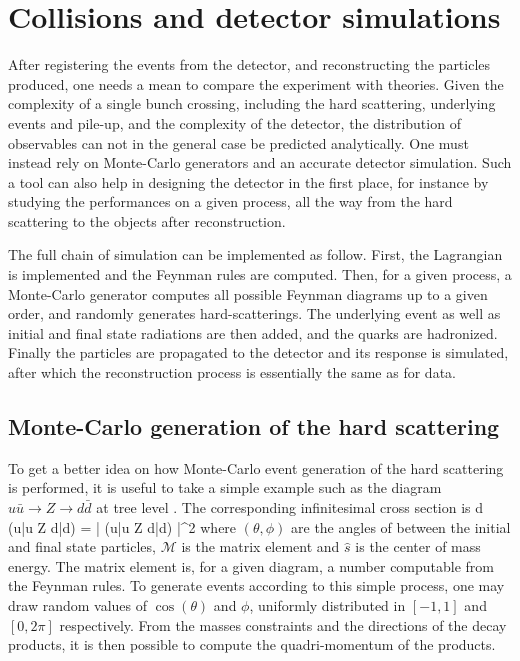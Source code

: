     \section{Collisions and detector simulations \label{sec:simu}}

    After registering the events from the detector, and reconstructing the particles
    produced, one needs a mean to compare the experiment with theories. Given
    the complexity of a single bunch crossing, including the hard scattering,
    underlying events and pile-up, and the complexity of the detector, the distribution
    of observables can not in the general case be predicted analytically. One must
    instead rely on Monte-Carlo generators and an accurate detector simulation.
    Such a tool can also help in designing the detector in the first place, for
    instance by studying the performances on a given process, all the way
    from the hard scattering to the objects after reconstruction.

    The full chain of simulation can be implemented as follow. First, the Lagrangian
    is implemented and the Feynman rules are computed. Then, for a given process, a
    Monte-Carlo generator computes all possible Feynman diagrams up to a given order, and
    randomly generates hard-scatterings. The underlying event as well as initial and final
    state radiations are then added, and the quarks are hadronized. Finally the particles
    are propagated to the detector and its response is simulated, after which the
    reconstruction process is essentially the same as for data.


    \subsection{Monte-Carlo generation of the hard scattering}

    To get a better idea on how Monte-Carlo event generation of the hard scattering
    is performed, it is useful to take a simple example such as the diagram
    $u\bar{u} \rightarrow Z \rightarrow d\bar{d}$ at tree level \cite{MCGenLesHouches}. The corresponding
    infinitesimal cross section is
    {
        d \sigma(u\bar{u} \rightarrow Z \rightarrow d\bar{d})
        =
        \left|
            (u\bar{u} \rightarrow Z \rightarrow d\bar{d})
        \right|^2
    }
    where $(\theta,\phi)$ are the angles of between the initial and final state particles,
    $\mathcal{M}$ is the matrix element and $\hat{s}$ is the center of mass energy. The
    matrix element is, for a given diagram, a number computable from the Feynman rules.
    To generate events according to this simple process, one may draw random
    values of $\cos(\theta)$ and $\phi$, uniformly distributed in $[-1, 1]$ and
    $[0,2\pi]$ respectively. From the masses constraints and the directions of the
    decay products, it is then possible to compute the quadri-momentum of the products.

